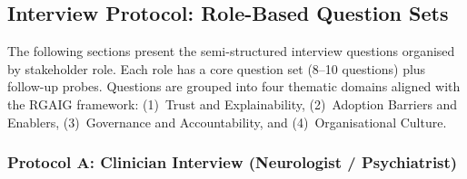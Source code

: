 \subsection{Interview Protocol: Role-Based Question Sets}

The following sections present the semi-structured interview questions organised by stakeholder role. Each role has a core question set (8--10 questions) plus follow-up probes. Questions are grouped into four thematic domains aligned with the RGAIG framework: (1)~Trust and Explainability, (2)~Adoption Barriers and Enablers, (3)~Governance and Accountability, and (4)~Organisational Culture.

\subsubsection{Protocol A: Clinician Interview (Neurologist / Psychiatrist)}

